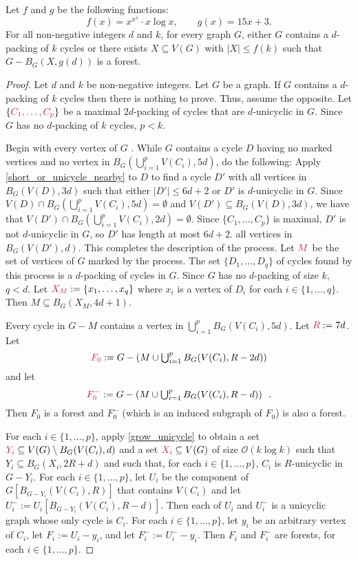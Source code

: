 \documentclass{patmorin}
\newcommand{\Oh}{\mathcal{O}}
\DeclarePairedDelimiter\set{\{}{\}}
\begin{document}
\begin{thm}\label{thm:the-big-ball-of-wax}
  Let $f$ and $g$ be the following functions:
  \[
    f(x)= x^{x^x}\cdot x\log x,\qquad
    g(x)= 15x +3.
  \]
  For all non-negative integers $d$ and $k$, for every graph $G$, either $G$ contains a $d$-packing of $k$ cycles or there exists $X\subseteq V(G)$ with $|X|\leq f(k)$ such that $G-B_G(X,g(d))$ is a forest.
\end{thm}

\begin{proof}
  Let $d$ and $k$ be non-negative integers. Let $G$ be a graph. If $G$ contains a $d$-packing of $k$ cycles then there is nothing to prove. Thus, assume the opposite. Let $\set{\mathdefin{C_1,\ldots,C_p}}$ be a maximal $2d$-packing of cycles that are $d$-unicyclic in $G$.  Since $G$ has no $d$-packing of $k$ cycles, $p<k$.

  Begin with every vertex of $G$ .  While $G$ contains a cycle $D$ having no marked vertices and no vertex in $B_G(\bigcup_{i=1}^p V(C_i),5d)$, do the following:  Apply \cref{short_or_unicycle_nearby} to $D$ to find a cycle $D'$ with all vertices in  $B_G(V(D),3d)$ such that either $|D'|\leq 6d+2$ or $D'$ is $d$-unicyclic in $G$. Since $V(D)\cap B_G(\bigcup_{i=1}^p V(C_i),5d)=\emptyset$ and $V(D')\subseteq B_G(V(D),3d)$, we have that $V(D')\cap B_G(\bigcup_{i=1}^p V(C_i),2d)=\emptyset$. Since $\{C_1,\ldots,C_p\}$ is maximal, $D'$ is not $d$-unicyclic in $G$, so $D'$ has length at most $6d+2$.   all vertices in $B_G(V(D'),d)$. This completes the description of the process.  Let $\mathdefin{M}$ be the set of vertices of $G$ marked by the process.  The set $\{D_1,\ldots,D_{q}\}$ of cycles found by this process is a $d$-packing of cycles in $G$.  Since $G$ has no $d$-packing of size $k$, $q<d$. Let $\mathdefin{X_M}:=\{x_1,\ldots,x_{q}\}$ where  $x_i$ is a vertex of $D_i$ for each $i\in\{1,\ldots,q\}$. Then $M\subseteq B_G(X_M,4d+1)$.

Every cycle in $G-M$ contains a vertex in $\bigcup_{i=1}^p B_G(V(C_i),5d)$.
Let $\mathdefin{R}:=7d$.
Let
\[
  \textstyle\mathdefin{F_0}:=G-\left(M\cup \bigcup_{i=1}^p B_G(V(C_i),R-2d)\right)
\]
and let
\[
  \textstyle\mathdefin{F^-_0}:=G-\left(M\cup \bigcup_{i=1}^p B_G(V(C_i),R-d)\right) \enspace .
\]
Then $F_0$ is a forest and $F^-_0$  (which is an induced subgraph of $F_0$) is also a forest.

For each $i\in\{1,\ldots,p\}$, apply \cref{grow_unicycle} to obtain a set $\mathdefin{Y_i}\subseteq V(G)\setminus B_G(V(C_i),d)$ and a set $\mathdefin{X_i}\subseteq V(G)$ of size $\Oh(k\log k)$ such that $Y_i\subseteq B_G(X_i,2R+d)$ and such that, for each $i\in\{1,\ldots,p\}$, $C_i$ is $R$-unicyclic in $G-Y_i$.  For each $i\in\{1,\ldots,p\}$, let $U_i$ be the component of $G[B_{G-Y_i}(V(C_i),R)]$ that contains $V(C_i)$ and let $U_i^-:=U_i[B_{G-Y_i}(V(C_i),R-d)]$.  Then each of $U_i$ and $U^-_i$ is a unicyclic graph whose only cycle is $C_i$.   For each $i\in\{1,\ldots,p\}$, let $y_i$ be an arbitrary vertex of $C_i$, let $F_i:=U_i-y_i$, and let $F^-_i:=U^-_i-y_i$. Then $F_i$ and $F_i^-$ are forests, for each $i\in\{1,\ldots,p\}$.


\end{proof}
\end{document}
